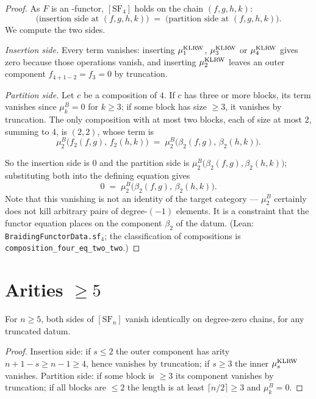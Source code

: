\begin{proof}
  As $F$ is an \Ainf-functor, $[\mathrm{SF}_4]$ holds on the chain
  $(f,g,h,k)$:
  \[
    \text{(insertion side at $(f,g,h,k)$)}
      \;=\; \text{(partition side at $(f,g,h,k)$)} .
  \]
  We compute the two sides.

  \emph{Insertion side.} Every term vanishes: inserting $\mu^{\operatorname{KLRW}}_1$,
  $\mu^{\operatorname{KLRW}}_3$ or $\mu^{\operatorname{KLRW}}_4$ gives zero because those operations
  vanish, and inserting $\mu^{\operatorname{KLRW}}_2$ leaves an outer component
  $f_{4+1-2} = f_3 = 0$ by truncation.

  \emph{Partition side.} Let $c$ be a composition of $4$. If $c$ has three or
  more blocks, its term vanishes since $\mu^B_k = 0$ for $k \geq 3$; if some
  block has size $\geq 3$, it vanishes by truncation. The only composition
  with at most two blocks, each of size at most $2$, summing to $4$, is
  $(2,2)$, whose term is
  \[
    \mu^B_2\big(f_2(f,g),\, f_2(h,k)\big)
    \;=\; \mu^B_2\big(\beta_2(f,g),\, \beta_2(h,k)\big).
  \]

  So the insertion side is $0$ and the partition side is
  $\mu^B_2\big(\beta_2(f,g), \beta_2(h,k)\big)$; substituting both into the
  defining equation gives
  \[
    0 \;=\; \mu^B_2\big(\beta_2(f,g),\, \beta_2(h,k)\big) .
  \]
  Note that this vanishing is not an identity of the target category ---
  $\mu^B_2$ certainly does not kill arbitrary pairs of degree-$(-1)$
  elements. It is a constraint that the functor equation places on the
  component $\beta_2$ of the datum. (Lean:
  \texttt{BraidingFunctorData.sf}$_4$; the classification of compositions is
  \texttt{composition\_four\_eq\_two\_two}.)
\end{proof}

\section{Arities \texorpdfstring{$\geq 5$}{>= 5}}

\begin{proposition}\label{prop:sf-high}
  For $n \geq 5$, both sides of $[\mathrm{SF}_n]$ vanish identically on
  degree-zero chains, for any truncated datum.
\end{proposition}

\begin{proof}
  Insertion side: if $s \leq 2$ the outer component has arity
  $n + 1 - s \geq n - 1 \geq 4$, hence vanishes by truncation; if $s \geq 3$
  the inner $\mu^{\operatorname{KLRW}}_s$ vanishes. Partition side: if some block is
  $\geq 3$ its component vanishes by truncation; if all blocks are $\leq 2$
  the length is at least $\lceil n/2 \rceil \geq 3$ and $\mu^B_k = 0$.
\end{proof}

